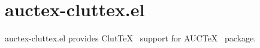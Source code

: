 \documentclass{article}
\begin{document}
\section*{auctex-cluttex.el}
\textsf{auctex-cluttex.el} provides
\textsf{Clut\TeX}~\cite{cluttex} support for
\textsf{AUC\TeX}~\cite{auctex} package.




\printindex
\end{document}
